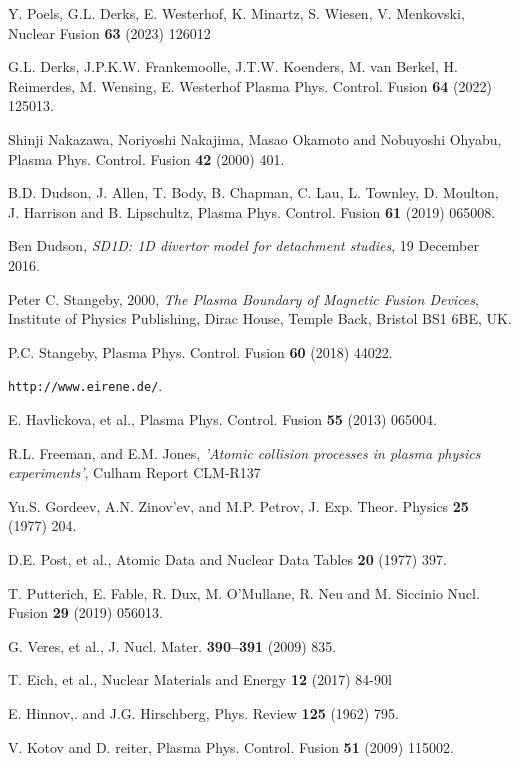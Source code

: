 \documentclass[amsmath,amssymb,a4]{revtex4-2}
\begin{document}
{\begin{thebibliography}{99}
Y. Poels, G.L. Derks, E. Westerhof, K. Minartz, S. Wiesen, V. Menkovski, Nuclear Fusion {\bf 63} (2023) 126012


G.L. Derks, J.P.K.W. Frankemo{\:o}lle, J.T.W. Koenders, M. {van Berkel}, H. Reimerdes, M. Wensing, E. Westerhof  Plasma Phys. Control. Fusion {\bf 64} (2022) 125013.

Shinji Nakazawa, Noriyoshi Nakajima, Masao Okamoto and Nobuyoshi Ohyabu, Plasma Phys. Control. Fusion {\bf 42} (2000) 401.

B.D. Dudson, J. Allen, T. Body, B. Chapman, C. Lau, L. Townley, D. Moulton, J. Harrison and B. Lipschultz, Plasma Phys. Control. Fusion {\bf 61} (2019) 065008.

Ben Dudson, {\it SD1D: 1D divertor model for detachment studies}, 19 December 2016.

Peter C. Stangeby, 2000, {\it The Plasma Boundary of Magnetic Fusion Devices}, Institute of Physics Publishing, Dirac House, Temple Back, Bristol BS1 6BE,
UK.

P.C. Stangeby, Plasma Phys. Control. Fusion {\bf 60} (2018) 44022. 


{\tt http://www.eirene.de/}.

E. Havlickova, et al., Plasma Phys. Control. Fusion {\bf 55} (2013) 065004.

R.L. Freeman, and E.M. Jones, {\it 'Atomic collision processes in plasma physics experiments'}, Culham Report CLM-R137

Yu.S. Gordeev, A.N. Zinov'ev, and M.P. Petrov, J. Exp. Theor. Physics {\bf 25} (1977) 204.

D.E. Post, et al., Atomic Data and Nuclear Data Tables {\bf 20} (1977) 397.

T. Putterich, E. Fable, R. Dux, M. O'Mullane, R. Neu and M. Siccinio Nucl. Fusion {\bf 29} (2019) 056013.

G. Veres, et al., J. Nucl. Mater. {\bf 390–391} (2009) 835.

T. Eich, et al., Nuclear Materials and Energy {\bf 12} (2017) 84-90l

E. Hinnov,. and J.G. Hirschberg, Phys. Review {\bf 125} (1962) 795.

V. Kotov and D. reiter, Plasma Phys. Control. Fusion {\bf 51} (2009) 115002.


\end{thebibliography}}
\end{document}

